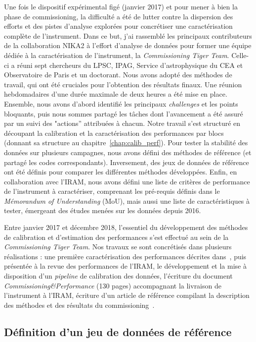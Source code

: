 Une fois le dispositif expérimental figé (janvier 2017) et pour mener à bien la phase de commissioning, la difficulté a été de lutter contre la dispersion des efforts et des pistes d'analyse explorées pour concrétiser une caractérisation complète de l'instrument. Dans ce
but, j'ai rassemblé les principaux contributeurs de la collaboration
NIKA2 à l'effort d'analyse de données pour former une équipe dédiée à
la caractérisation de l'instrument, la \emph{Commissioning Tiger
  Team}. Celle-ci a réuni sept chercheurs du LPSC, IPAG,
Service d'astrophysique du CEA et Observatoire de Paris et un
doctorant. Nous avons adopté des méthodes de travail, qui ont été
cruciales pour l'obtention des résultats finaux. Une réunion
hebdomadaires d'une durée maximale de deux heures a été mise en
place. Ensemble, nous avons d'abord identifié les principaux
\emph{challenges} et les points
bloquants, puis nous sommes partagé les tâches dont l'avancement a été
assuré par un suivi des "actions'' attribuées à chacun. Notre travail
s'est structuré en découpant la calibration et la caractérisation des
performances par blocs (donnant sa structure au chapitre~\ref{chap:calib_perf}). Pour
tester la stabilité des données sur plusieurs campagnes, nous avons
défini des méthodes de référence (et partagé les codes
correspondants). Inversement, des jeux de données de référence ont été
définis pour comparer les différentes méthodes développées. Enfin, en
collaboration avec l'IRAM, nous avons défini une liste de
critères de performance de l'instrument à caractériser, comprenant les
pré-requis définis dans le \emph{Mémorandum of Understanding} (MoU),
mais aussi une liste de caractéristiques à tester, émergeant des
études menées sur les données depuis 2016. 

Entre janvier 2017 et décembre 2018, l'essentiel du développement des
méthodes de calibration et d'estimation des performances s'est
effectué au sein de la \emph{Commissioning Tiger Team}. Nos travaux se
sont concrétisés dans plusieurs réalisations : une première
caractérisation des performances décrites dans~\citet{Adam2018}, puis
présentée à la revue des performances de l'IRAM, le développement et
la mise à disposition d'un \emph{pipeline} de calibration des données,
l'écriture du document \emph{Commissioning\&Performance} (130 pages)
accompagnant la livraison de l'instrument à l'IRAM, écriture d'un
article de référence compilant la description des méthodes et des
résultats du commissioning~\citep{Perotto2019}. 



\subsection{Définition d'un jeu de données de référence}
\label{se:scan_selection}

